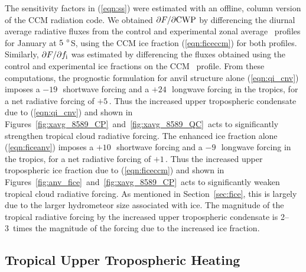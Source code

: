 \documentclass[twoside,agupp]{aguplus}
\begin{document}
The sensitivity factors in (\ref{eqn:ss}) were estimated with an
offline, column version of the CCM radiation code. 
We obtained $\partial F/\partial \mbox{\textrm{CWP}}$ by differencing the diurnal
average radiative fluxes from the control and experimental zonal
average \qc\ profiles for January at $5\ ^{\circ}$S, using the CCM ice
fraction (\ref{eqn:ficeccm}) for both profiles.  
Similarly, $\partial F/\partial \mbox{$f_\mathrm{i}$}$ was estimated by differencing
the fluxes obtained using the control and experimental ice fractions
on the CCM \qc\ profile. 
From these computations, the prognostic formulation for anvil
structure alone (\ref{eqn:qi_cnv}) imposes a $-19$\,\wxmS\ shortwave
forcing and a $+24$\,\wxmS\ longwave forcing in the tropics, for a net 
radiative forcing of $+5$\,\wxmS.
Thus the increased upper tropospheric condensate due to
(\ref{eqn:qi_cnv}) and shown in Figures~\ref{fig:xavg_8589_CP}\
and~\ref{fig:xavg_8589_QC}\ acts to significantly strengthen tropical
cloud radiative forcing.   
The enhanced ice fraction alone (\ref{eqn:ficeanv}) imposes a
$+10$\,\wxmS\ shortwave forcing and a $-9$\,\wxmS\ longwave forcing in
the tropics, for a net radiative forcing of $+1$\,\wxmS.
Thus the increased upper tropospheric ice fraction due to
(\ref{eqn:ficeccm}) and shown in Figures~\ref{fig:anv_fice}\
and~\ref{fig:xavg_8589_CP}\ acts to significantly weaken tropical
cloud radiative forcing.    
As mentioned in Section~\ref{sec:fice}, this is largely due to the 
larger hydrometeor size associated with ice.
The magnitude of the tropical radiative forcing by the increased upper
tropospheric condensate is 2--3~times the magnitude of the forcing due
to the increased ice fraction. 

\subsection{Tropical Upper Tropospheric Heating}\label{sec:tut} 
\end{document}
